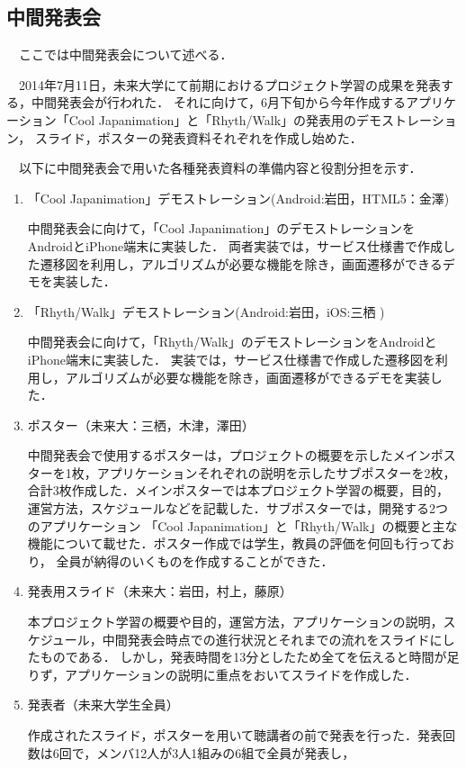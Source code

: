 \subsection{中間発表会}
\par　ここでは中間発表会について述べる．
\par　2014年7月11日，未来大学にて前期におけるプロジェクト学習の成果を発表する，中間発表会が行われた．
それに向けて，6月下旬から今年作成するアプリケーション「Cool Japanimation」と「Rhyth/Walk」の発表用のデモストレーション，
スライド，ポスターの発表資料それぞれを作成し始めた．
\par　以下に中間発表会で用いた各種発表資料の準備内容と役割分担を示す．
\begin{enumerate}
\item
「Cool Japanimation」デモストレーション(Android:岩田，HTML5：金澤)
\par 中間発表会に向けて，「Cool Japanimation」のデモストレーションをAndroidとiPhone端末に実装した．
両者実装では，サービス仕様書で作成した遷移図を利用し，アルゴリズムが必要な機能を除き，画面遷移ができるデモを実装した．
\item 「Rhyth/Walk」デモストレーション(Android:岩田，iOS:三栖 )
\par
中間発表会に向けて，「Rhyth/Walk」のデモストレーションをAndroidとiPhone端末に実装した．
実装では，サービス仕様書で作成した遷移図を利用し，アルゴリズムが必要な機能を除き，画面遷移ができるデモを実装した．
\item ポスター（未来大：三栖，木津，澤田）
\par
中間発表会で使用するポスターは，プロジェクトの概要を示したメインポスターを1枚，アプリケーションそれぞれの説明を示したサブポスターを2枚，
合計3枚作成した．メインポスターでは本プロジェクト学習の概要，目的，運営方法，スケジュールなどを記載した．サブポスターでは，開発する2つのアプリケーション
「Cool Japanimation」と「Rhyth/Walk」の概要と主な機能について載せた．ポスター作成では学生，教員の評価を何回も行っており，
全員が納得のいくものを作成することができた．
\item 発表用スライド（未来大：岩田，村上，藤原）
\par
本プロジェクト学習の概要や目的，運営方法，アプリケーションの説明，スケジュール，中間発表会時点での進行状況とそれまでの流れをスライドにしたものである．
しかし，発表時間を13分としたため全てを伝えると時間が足りず，アプリケーションの説明に重点をおいてスライドを作成した．
\item 発表者（未来大学生全員）
\par
作成されたスライド，ポスターを用いて聴講者の前で発表を行った．発表回数は6回で，メンバ12人が3人1組みの6組で全員が発表し，

\end{enumerate}
